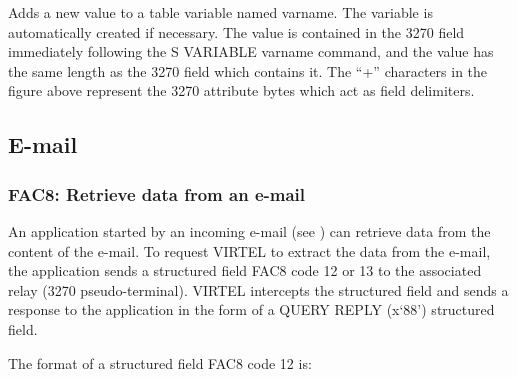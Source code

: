 \documentclass[letterpaper,10pt,english]{sphinxmanual}
\begin{document}
\begin{sphinxVerbatim}[commandchars=\\\{\}]
  
\end{sphinxVerbatim}

Adds a new value to a table variable named varname. The variable is automatically created if necessary. The value is
contained in the 3270 field immediately following the S VARIABLE varname command, and the value has the same
length as the 3270 field which contains it. The “+” characters in the figure above represent the 3270 attribute bytes
which act as field delimiters.


\subsection{E-mail}
\label{\detokenize{User_Guide:e-mail}}

\subsubsection{FAC8: Retrieve data from an e-mail}
\label{\detokenize{User_Guide:v457ug-email-retrieve-data}}\label{\detokenize{User_Guide:fac8-retrieve-data-from-an-e-mail}}
An application started by an incoming e-mail (see {\hyperref[\detokenize{User_Guide:v457ug-email-incoming}]{}}) can retrieve data from the content
of the e-mail. To request VIRTEL to extract the data from the e-mail, the application sends a structured field FAC8 code
12 or 13 to the associated relay (3270 pseudo-terminal). VIRTEL intercepts the structured field and sends a response to
the application in the form of a QUERY REPLY (x‘88’) structured field.


The format of a structured field FAC8 code 12 is:
\end{document}
